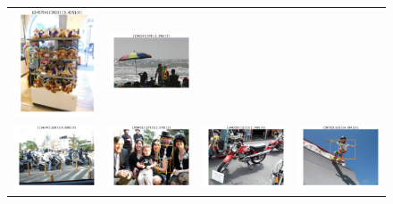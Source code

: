 \documentclass[10pt,onecolumn,letterpaper]{article}
\begin{document}
\begin{figure}[h!]
{\begin{tabular}{c|c|c|c}
\includegraphics[width=.25\linewidth,height=.15\paperwidth,keepaspectratio]{./result/rmpe/localization_errors/keypoints_breakdown/inversion_5.pdf} &
\includegraphics[width=.25\linewidth,height=.15\paperwidth,keepaspectratio]{./result/rmpe/localization_errors/keypoints_breakdown/jitter_5.pdf} \\
\includegraphics[width=.25\linewidth,height=.15\paperwidth,keepaspectratio]{./result/rmpe/localization_errors/keypoints_breakdown/miss_6.pdf} &
\includegraphics[width=.25\linewidth,height=.15\paperwidth,keepaspectratio]{./result/rmpe/localization_errors/keypoints_breakdown/swap_6.pdf} &
\includegraphics[width=.25\linewidth,height=.15\paperwidth,keepaspectratio]{./result/rmpe/localization_errors/keypoints_breakdown/inversion_6.pdf} &
\includegraphics[width=.25\linewidth,height=.15\paperwidth,keepaspectratio]{./result/rmpe/localization_errors/keypoints_breakdown/jitter_6.pdf} \\

\end{tabular}}
\end{figure}
\end{document}
